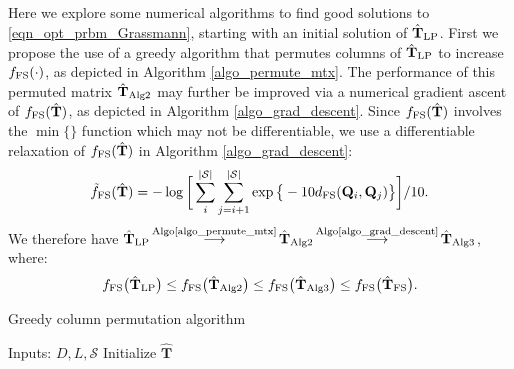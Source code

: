 \documentclass[journal,comsoc]{IEEEtran}
\begin{document}
\begin{appendices}
%
\section{} \label{appdix5}
Here we explore some numerical algorithms to find good solutions to \eqref{eqn_opt_prbm_Grassmann}, starting with an initial solution of $\hat{\mathbf{T}}_{\rm LP}$. First we propose the use of a greedy algorithm that permutes columns of $\hat{\mathbf{T}}_{\rm LP}$ to increase $f_{\rm FS}(\cdot)$, as depicted in Algorithm \ref{algo_permute_mtx}. 
%
The performance of this permuted matrix $\hat{\mathbf{T}}_{\rm Alg2}$ may further be improved via a numerical gradient ascent of $f_{\rm FS}(\hat{\mathbf{T}})$, as depicted in Algorithm \ref{algo_grad_descent}. Since $f_{\rm FS}(\hat{\mathbf{T}})$ involves the $\min\{\}$ function which may not be differentiable, we use a differentiable relaxation of $f_{\rm FS}(\hat{\mathbf{T}})$ in Algorithm \ref{algo_grad_descent}:
$$\tilde{f}_{\rm FS}(\hat{\mathbf{T}}) = - \log \bigg[ \sum_{i}^{|\mathcal{S}|} \sum_{j = i+1}^{|\mathcal{S}|} \exp{ \big\{ -10 d_{\rm FS}(\mathbf{Q}_i,\mathbf{Q}_j) \big\}} \bigg]/10. $$
We therefore have $\hat{\mathbf{T}}_{\rm LP} \,{\buildrel \text{Algo\ref{algo_permute_mtx}} \over \longrightarrow }\, \hat{\mathbf{T}}_{\rm Alg2} \,{\buildrel \text{Algo\ref{algo_grad_descent}} \over \longrightarrow }\, \hat{\mathbf{T}}_{\rm Alg3}$, where: 
$$ f_{\rm FS}\big(\hat{\mathbf{T}}_{\rm LP} \big) \leq f_{\rm FS} \big(\hat{\mathbf{T}}_{\rm Alg2} \big) \leq f_{\rm FS} \big(\hat{\mathbf{T}}_{\rm Alg3} \big) \leq f_{\rm FS} \big(\hat{\mathbf{T}}_{\rm FS} \big).$$
%
%
\begin{algorithm}
\caption{Greedy column permutation algorithm}\label{algo_permute_mtx}
\begin{algorithmic}[1]
\STATE Inputs: $D, L, \mathcal{S}$
\STATE Initialize $\hat{\mathbf{T}}$
%
\REPEAT
{}
\ENDFOR
{}
\ENDIF
\ENDFOR
%

\end{algorithmic}
\end{algorithm}
\end{appendices}
\end{document}
